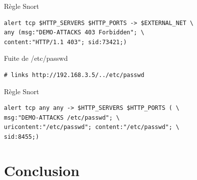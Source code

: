 \documentclass{beamer}
\begin{document}
{\begin{exampleblock}{Règle Snort}
\begin{verbatim}
alert tcp $HTTP_SERVERS $HTTP_PORTS -> $EXTERNAL_NET \
any (msg:"DEMO-ATTACKS 403 Forbidden"; \
content:"HTTP/1.1 403"; sid:73421;)
\end{verbatim}
\end{exampleblock}

\framebreak

\begin{block}{Fuite de /etc/passwd}
\begin{verbatim}
# links http://192.168.3.5/../etc/passwd
\end{verbatim}
\end{block}

\begin{exampleblock}{Règle Snort}
\begin{verbatim}
alert tcp any any -> $HTTP_SERVERS $HTTP_PORTS ( \
msg:"DEMO-ATTACKS /etc/passwd"; \
uricontent:"/etc/passwd"; content:"/etc/passwd"; \
sid:8455;)
\end{verbatim}
\end{exampleblock}

}

\section{Conclusion}
\end{document}

